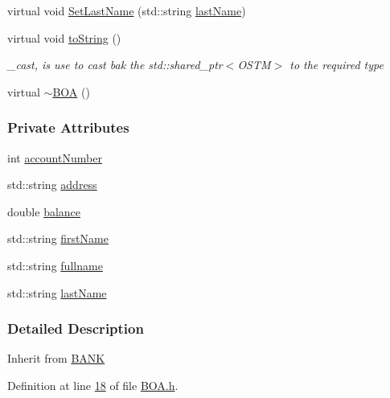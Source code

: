 \begin{DoxyCompactItemize}
\item 
virtual void \hyperlink{class_b_o_a_a7ea44308c05532cd11ff3ce8f14ea4c2_a7ea44308c05532cd11ff3ce8f14ea4c2}{Set\+Last\+Name} (std\+::string \hyperlink{class_b_o_a_ab7749e6e945beaca57a3ef01259c6fea_ab7749e6e945beaca57a3ef01259c6fea}{last\+Name})
\item 
virtual void \hyperlink{class_b_o_a_a348df0299997f81bcad0ec034dab0b8d_a348df0299997f81bcad0ec034dab0b8d}{to\+String} ()
\begin{DoxyCompactList}\small\item\em \+\_\+cast, is use to cast bak the std\+::shared\+\_\+ptr$<$\+O\+S\+T\+M$>$ to the required type \end{DoxyCompactList}\item 
virtual \hyperlink{class_b_o_a_abe27b17a23ceffc6269dbe6d81de5212_abe27b17a23ceffc6269dbe6d81de5212}{$\sim$\+B\+OA} ()
\end{DoxyCompactItemize}
\subsubsection*{Private Attributes}
\begin{DoxyCompactItemize}
\item 
int \hyperlink{class_b_o_a_a86ca4ad716db205f04c337b39b34d9ba_a86ca4ad716db205f04c337b39b34d9ba}{account\+Number}
\item 
std\+::string \hyperlink{class_b_o_a_afb2d7d0c5c05169a72bbc6f1d2cc737f_afb2d7d0c5c05169a72bbc6f1d2cc737f}{address}
\item 
double \hyperlink{class_b_o_a_a2061c36a15924de9186ec5c83dc7da2f_a2061c36a15924de9186ec5c83dc7da2f}{balance}
\item 
std\+::string \hyperlink{class_b_o_a_acb1b3b2a69e403c4e0e3fb08fdbb52a0_acb1b3b2a69e403c4e0e3fb08fdbb52a0}{first\+Name}
\item 
std\+::string \hyperlink{class_b_o_a_aed3225e383c08b1b7c962a0e43b180d1_aed3225e383c08b1b7c962a0e43b180d1}{fullname}
\item 
std\+::string \hyperlink{class_b_o_a_ab7749e6e945beaca57a3ef01259c6fea_ab7749e6e945beaca57a3ef01259c6fea}{last\+Name}
\end{DoxyCompactItemize}


\subsubsection{Detailed Description}
Inherit from \hyperlink{class_b_a_n_k}{B\+A\+NK} 

Definition at line \hyperlink{_b_o_a_8h_source_l00018}{18} of file \hyperlink{_b_o_a_8h_source}{B\+O\+A.\+h}.



